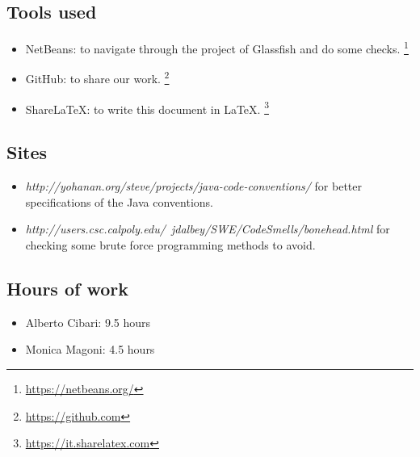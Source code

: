 \subsection*{Tools used}
    \begin{itemize}
        \item NetBeans: to navigate through the project of Glassfish and do some checks. 
            \footnote{\url{https://netbeans.org/}} 
        \item GitHub: to share our work. 
            \footnote{\url{https://github.com}} 
        \item ShareLaTeX: to write this document in LaTeX. 
            \footnote{\url{https://it.sharelatex.com}}
    \end{itemize}

\subsection*{Sites}
    \begin{itemize}
        \item \textit{http://yohanan.org/steve/projects/java-code-conventions/} for better specifications of the Java conventions.
        \item \textit{http://users.csc.calpoly.edu/~jdalbey/SWE/CodeSmells/bonehead.html} for checking some brute force programming methods to avoid.
    \end{itemize}

\subsection*{Hours of work}
    \begin{itemize}
    \item Alberto Cibari: 9.5 hours
    \item Monica Magoni:  4.5 hours
    \end{itemize}
